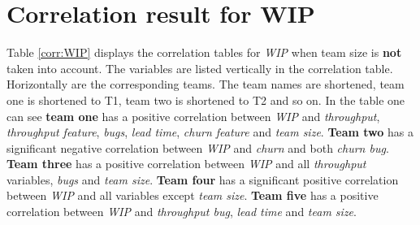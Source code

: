 \documentclass[UKenglish]{ifimaster}  %
\begin{document}
\section{Correlation result for WIP}
\label{sec:corr:WIP}
Table \ref{corr:WIP} displays the correlation tables for \textit{WIP} when team size is \textbf{not} taken into account. The variables are listed vertically in the correlation table. Horizontally are the corresponding teams. The team names are shortened, team one is shortened to T1, team two is shortened to T2 and so on. In the table one can see \textbf{team one} has a positive correlation between \textit{WIP} and \textit{throughput}, \textit{throughput feature}, \textit{bugs}, \textit{lead time}, \textit{churn feature} and \textit{team size}. \textbf{Team two} has a significant negative correlation between \textit{WIP} and \textit{churn} and both \textit{churn bug}. \textbf{Team three} has a positive correlation between \textit{WIP} and  all \textit{throughput} variables, \textit{bugs} and \textit{team size}. \textbf{Team four} has a significant positive correlation between \textit{WIP} and all variables except \textit{team size}. \textbf{Team five} has a positive correlation between \textit{WIP} and \textit{throughput bug}, \textit{lead time} and \textit{team size}.
\end{document}
